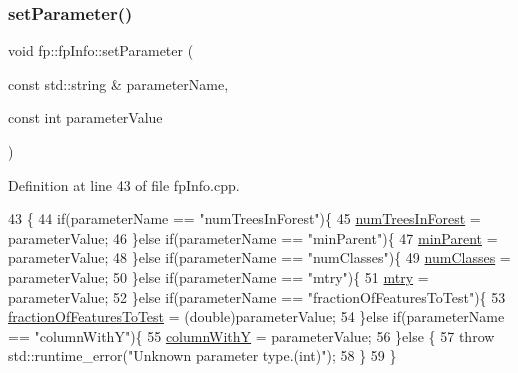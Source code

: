 \subsubsection{\texorpdfstring{set\+Parameter()}{setParameter()}\hspace{0.1cm}{\footnotesize\ttfamily [3/3]}}
{\footnotesize\ttfamily void fp\+::fp\+Info\+::set\+Parameter (\begin{DoxyParamCaption}\item[{const std\+::string \&}]{parameter\+Name,  }\item[{const int}]{parameter\+Value }\end{DoxyParamCaption})}



Definition at line 43 of file fp\+Info.\+cpp.


\begin{DoxyCode}
43                                                                                      \{
44         \textcolor{keywordflow}{if}(parameterName == \textcolor{stringliteral}{"numTreesInForest"})\{
45             \hyperlink{classfp_1_1fpInfo_a8dbd62dca5c972c29d29a69d90ca2632}{numTreesInForest} = parameterValue;
46         \}\textcolor{keywordflow}{else} \textcolor{keywordflow}{if}(parameterName == \textcolor{stringliteral}{"minParent"})\{
47             \hyperlink{classfp_1_1fpInfo_a128fab7ba6da0fc76da00b48bb1bd7d5}{minParent} = parameterValue;
48         \}\textcolor{keywordflow}{else} \textcolor{keywordflow}{if}(parameterName == \textcolor{stringliteral}{"numClasses"})\{
49             \hyperlink{classfp_1_1fpInfo_a1c98a9ced12230f21003f78d742625a3}{numClasses} = parameterValue;
50         \}\textcolor{keywordflow}{else} \textcolor{keywordflow}{if}(parameterName == \textcolor{stringliteral}{"mtry"})\{
51             \hyperlink{classfp_1_1fpInfo_a62cccc1eb5641ebec2a6cc86cf03eedf}{mtry} = parameterValue;
52         \}\textcolor{keywordflow}{else} \textcolor{keywordflow}{if}(parameterName == \textcolor{stringliteral}{"fractionOfFeaturesToTest"})\{
53             \hyperlink{classfp_1_1fpInfo_ab949cb97523283367e9b120fd78e3c3b}{fractionOfFeaturesToTest} = (double)parameterValue;
54         \}\textcolor{keywordflow}{else} \textcolor{keywordflow}{if}(parameterName == \textcolor{stringliteral}{"columnWithY"})\{
55             \hyperlink{classfp_1_1fpInfo_ac29e135cd84cdef547b678e7ea37f92d}{columnWithY} = parameterValue;
56         \}\textcolor{keywordflow}{else} \{
57             \textcolor{keywordflow}{throw} std::runtime\_error(\textcolor{stringliteral}{"Unknown parameter type.(int)"});
58         \}
59     \}
\end{DoxyCode}
\mbox{\label{classfp_1_1fpInfo_a0a00d3d54cef667000249202a2d768bf}} 
